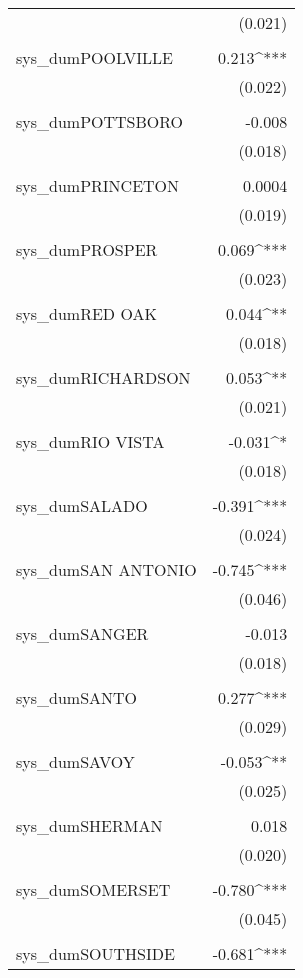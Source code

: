 \begin{table}[!htbp]
\begin{tabular}{@{\extracolsep{5pt}}lD{.}{.}{-3} }
  & (0.021) \\ 
  & \\ 
 sys\_dumPOOLVILLE & 0.213^{***} \\ 
  & (0.022) \\ 
  & \\ 
 sys\_dumPOTTSBORO & -0.008 \\ 
  & (0.018) \\ 
  & \\ 
 sys\_dumPRINCETON & 0.0004 \\ 
  & (0.019) \\ 
  & \\ 
 sys\_dumPROSPER & 0.069^{***} \\ 
  & (0.023) \\ 
  & \\ 
 sys\_dumRED OAK & 0.044^{**} \\ 
  & (0.018) \\ 
  & \\ 
 sys\_dumRICHARDSON & 0.053^{**} \\ 
  & (0.021) \\ 
  & \\ 
 sys\_dumRIO VISTA & -0.031^{*} \\ 
  & (0.018) \\ 
  & \\ 
 sys\_dumSALADO & -0.391^{***} \\ 
  & (0.024) \\ 
  & \\ 
 sys\_dumSAN ANTONIO & -0.745^{***} \\ 
  & (0.046) \\ 
  & \\ 
 sys\_dumSANGER & -0.013 \\ 
  & (0.018) \\ 
  & \\ 
 sys\_dumSANTO & 0.277^{***} \\ 
  & (0.029) \\ 
  & \\ 
 sys\_dumSAVOY & -0.053^{**} \\ 
  & (0.025) \\ 
  & \\ 
 sys\_dumSHERMAN & 0.018 \\ 
  & (0.020) \\ 
  & \\ 
 sys\_dumSOMERSET & -0.780^{***} \\ 
  & (0.045) \\ 
  & \\ 
 sys\_dumSOUTHSIDE & -0.681^{***} \\ 

\end{tabular}
\end{table}
